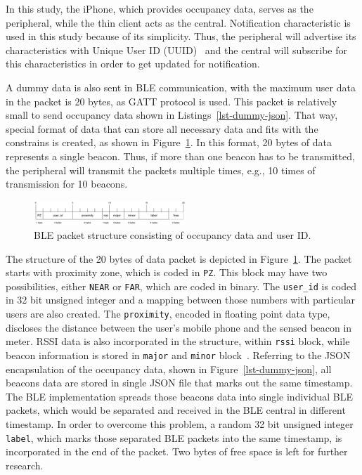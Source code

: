 \documentclass[journal]{vgtc}                %
\begin{document}
In this study, the iPhone, which provides occupancy data, serves as the peripheral, while the thin client acts as the central. Notification characteristic is used in this study because of its simplicity. Thus, the peripheral will advertise its characteristics with Unique User ID (UUID)~\cite{BluetoothSpecialInterestGroup2014} and the central will subscribe for this characteristics in order to get updated for notification.

A dummy data is also sent in BLE communication, with the maximum user data in the packet is 20 bytes, as GATT protocol is used. This packet is relatively small to send occupancy data shown in Listings~\ref{lst-dummy-json}. That way, special format of data that can store all necessary data and fits with the constrains is created, as shown in Figure~\ref{fig:ble-packet-structure}. In this format, 20 bytes of data represents a single beacon. Thus, if more than one beacon has to be transmitted, the peripheral will transmit the packets multiple times, e.g., 10 times of transmission for 10 beacons.

\begin{figure}
  \centering
    \includegraphics[width=0.51\textwidth]{ble-packet-structure}
  \caption{BLE packet structure consisting of occupancy data and user ID.}
  \label{fig:ble-packet-structure}
\end{figure}

The structure of the 20 bytes of data packet is depicted in Figure~\ref{fig:ble-packet-structure}. The packet starts with proximity zone, which is coded in \texttt{PZ}. This block may have two possibilities, either \texttt{NEAR} or \texttt{FAR}, which are coded in binary. The \verb|user_id| is coded in 32 bit unsigned integer and a mapping between those numbers with particular users are also created. The \verb|proximity|, encoded in floating point data type, discloses the distance between the user's mobile phone and the sensed beacon in meter. RSSI data is also incorporated in the structure, within \verb|rssi| block, while beacon information is stored in \verb|major| and \verb|minor| block~\cite{AppleInc.2014}. Referring to the JSON encapsulation of the occupancy data, shown in Figure~\ref{lst-dummy-json}, all beacons data are stored in single JSON file that marks out the same timestamp. The BLE implementation spreads those beacons data into single individual BLE packets, which would be separated and received in the BLE central in different timestamp. In order to overcome this problem, a random 32 bit unsigned integer \verb|label|, which marks those separated BLE packets into the same timestamp, is incorporated in the end of the packet. Two bytes of free space is left for further research.
\end{document}
